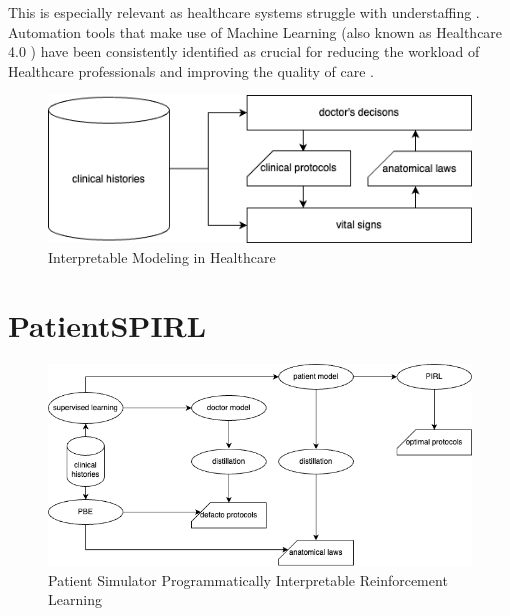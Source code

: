 This is especially relevant as healthcare systems struggle with understaffing \cite{ashleyy.metcalfHospitalUnitUnderstaffing2016,SurveyShowsHidden1993,UnderstaffingSignificantIssue2012,campbell_universal_2013, hudsonUnderstaffing2015, mercerMessageEditorinChief2008, r.stanleyUnderstaffedOverwhelmed2010, munnUnderstaffingWardsCompromising2017, thelancetHealthcareSystemStaffing2018}. Automation tools that make use of Machine Learning (also known as Healthcare 4.0 \cite{tortorellaHealthcareTrendsChallenges2020}) have been consistently identified as crucial for reducing the workload of Healthcare professionals and improving the quality of care \cite{agrawalMachineLearningHealthcare2020, deviDesignImplementationAdvanced2022, g.kumarSurveyMachineLearning2016, ganguliMachineLearningPursuit2020, maityMachineLearningImproved2017, mitraMachineLearningHealthcare2021, pianykhImprovingHealthcareOperations2020, xhaferraRoleMachineLearning2022}.


\begin{figure}
    \centering
    \includegraphics[width=0.8\linewidth]{images/PatientModelingInter.drawio.png}
    \caption{Interpretable Modeling in Healthcare}
    \label{fig:modelhealthinter}
\end{figure}



\newpage
\section{PatientSPIRL}

\begin{figure}
  \centering
  \includegraphics[width=\linewidth]{images/PSHealth.drawio.png}
  \caption{Patient Simulator Programmatically Interpretable Reinforcement Learning}
  \label{fig:pshealth}
\end{figure}
